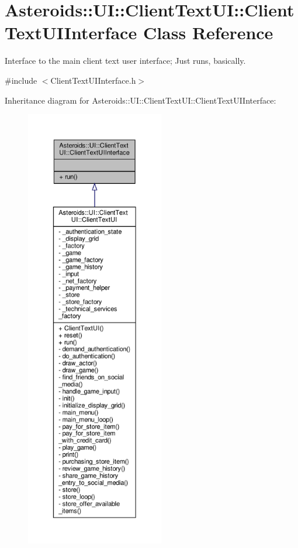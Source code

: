 \hypertarget{classAsteroids_1_1UI_1_1ClientTextUI_1_1ClientTextUIInterface}{}\section{Asteroids\+:\+:UI\+:\+:Client\+Text\+UI\+:\+:Client\+Text\+U\+I\+Interface Class Reference}
\label{classAsteroids_1_1UI_1_1ClientTextUI_1_1ClientTextUIInterface}


Interface to the main client text user interface; Just runs, basically.  




{\ttfamily \#include $<$Client\+Text\+U\+I\+Interface.\+h$>$}



Inheritance diagram for Asteroids\+:\+:UI\+:\+:Client\+Text\+UI\+:\+:Client\+Text\+U\+I\+Interface\+:
\nopagebreak
\begin{figure}[H]
\begin{center}
\leavevmode
\includegraphics[height=550pt]{classAsteroids_1_1UI_1_1ClientTextUI_1_1ClientTextUIInterface__inherit__graph}
\end{center}
\end{figure}



